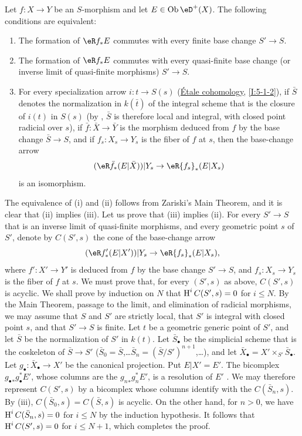 \begin{proposition}\label{VII:5-1-1}
Let $f:X\to Y$ be an $S$-morphism and let $E\in\ob \eD^+(X)$. The following
conditions are equivalent:
\begin{enumerate}[\indent (i)]
  \item The formation of $\eR f_\ast E$ commutes with every finite base change
    $S'\to S$.
  \item The formation of $\eR f_\ast E$ commutes with every quasi-finite base
    change (or inverse limit of quasi-finite morphisms) $S'\to S$.
  \item For every specialization arrow $i:t\to S(s)$
    (\hyperref[I]{Étale cohomology}, \ref{I:5-1-2}), if $\bar S$ denotes
    the normalization in $k(\bar t)$ of the integral scheme that is the
    closure of $i(t)$ in $S(s)$ (by
    \cite[IV, 6.15.5, 18.6.11, 18.8.16]{ega}, $\bar S$ is therefore local and
    integral, with closed point radicial over $s$), if
    $\bar f:\bar X\to \bar Y$ is the morphism deduced from $f$ by the base
    change $\bar S\to S$, and if $f_s:X_s\to Y_s$ is the fiber of $f$ at $s$,
    then the base-change arrow
    \[
      (\eR \bar f_\ast (E|\bar X))|Y_s \to \eR {f_s}_\ast(E|X_s) 
    \]
    is an isomorphism.
\end{enumerate}
\end{proposition}

The equivalence of (i) and (ii) follows from Zariski's Main Theorem, and it is
clear that (ii) implies (iii). Let us prove that (iii) implies (ii). For every
$S'\to S$ that is an inverse limit of quasi-finite morphisms, and every
geometric point $s$ of $S'$, denote by $C(S',s)$ the cone of the base-change
arrow
\[
  (\eR f'_\ast(E|X'))|Y_s \to \eR{f_s}_\ast (E|X_s) \text{,} 
\]
where $f':X'\to Y'$ is deduced from $f$ by the base change $S'\to S$, and
$f_s:X_s\to Y_s$ is the fiber of $f$ at $s$. We must prove that, for every
$(S',s)$ as above, $C(S',s)$ is acyclic. We shall prove by induction on $N$ that
$\operatorname{H}^i C(S',s) = 0$ for $i\leqslant N$. By the Main Theorem, passage to the
limit, and elimination of radicial morphisms, we may assume that $S$ and $S'$
are strictly local, that $S'$ is integral with closed point $s$, and that
$S'\to S$ is finite. Let $t$ be a geometric generic point of $S'$, and let
$\bar S$ be the normalization of $S'$ in $k(t)$. Let $\bar S_\bullet$ be the
simplicial scheme that is the coskeleton of $\bar S\to S'$
($\bar S_0=\bar S$,\ldots $\bar S_n=(\bar S/S')^{n+1}$,\ldots), and let
$\bar X_\bullet=X'\times_{S'} \bar S_\bullet$. Let
$g_\bullet:\bar X_\bullet \to X'$ be the canonical projection. Put
$E|X'=E'$. The bicomplex ${g_\bullet}_\ast g_\bullet^\ast E'$, whose columns
are the ${g_n}_\ast g_n^\ast E'$, is a resolution of $E'$
\cite[VIII 8]{sga4}. We may therefore represent $C(S',s)$ by a bicomplex whose
columns identify with the $C(\bar S_n,s)$. By (iii),
$C(\bar S_0,s)=C(\bar S,s)$ is acyclic. On the other hand, for $n>0$, we have
$\operatorname{H}^i C(\bar S_n,s)=0$ for $i\leqslant N$ by the induction hypothesis. It
follows that $\operatorname{H}^i C(S',s)=0$ for $i\leqslant N+1$, which completes the proof.





